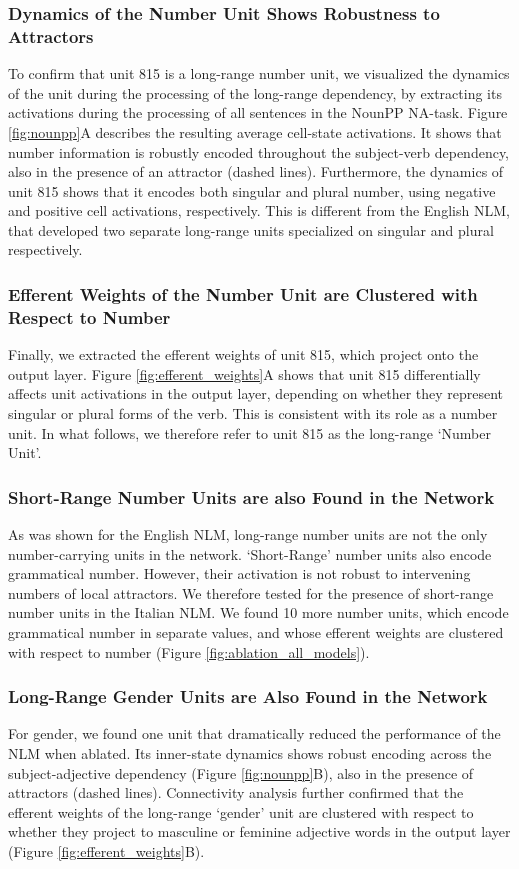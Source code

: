 \subsubsection{Dynamics of the Number Unit Shows Robustness to Attractors} 
To confirm that unit 815 is a long-range number unit, we visualized the dynamics of the unit during the processing of the long-range dependency, by extracting its activations during the processing of all sentences in the NounPP NA-task. Figure \ref{fig:nounpp}A describes the resulting average cell-state activations. It shows that number information is robustly encoded throughout the subject-verb dependency, also in the presence of an attractor (dashed lines). Furthermore, the dynamics of unit 815 shows that it encodes both singular and plural number, using negative and positive cell activations, respectively. This is different from the English NLM, that developed two separate long-range units specialized on singular and plural respectively.

\subsubsection{Efferent Weights of the Number Unit are Clustered with Respect to Number}
Finally, we extracted the efferent weights of unit 815, which project onto the output layer. Figure \ref{fig:efferent_weights}A shows that unit 815 differentially affects unit activations in the output layer, depending on whether they represent singular or plural forms of the verb. This is consistent with its role as a number unit. In what follows, we therefore refer to unit 815 as the long-range `Number Unit'.

\subsubsection{Short-Range Number Units are also Found in the Network}
As was shown for the English NLM, long-range number units are not the only number-carrying units in the network. `Short-Range' number units also encode grammatical number. However, their activation is not robust to intervening numbers of local attractors. We therefore tested for the presence of short-range number units in the Italian NLM. We found 10 more number units, which encode grammatical number in separate values, and whose efferent weights are clustered with respect to number (Figure \ref{fig:ablation_all_models}).

\subsubsection{Long-Range Gender Units are Also Found in the Network}
For gender, we found one unit that dramatically reduced the performance of the NLM when ablated. Its inner-state dynamics shows robust encoding across the subject-adjective dependency (Figure \ref{fig:nounpp}B), also in the presence of attractors (dashed lines). Connectivity analysis further confirmed that the efferent weights of the long-range `gender' unit are clustered with respect to whether they project to masculine or feminine adjective words in the output layer (Figure \ref{fig:efferent_weights}B).

